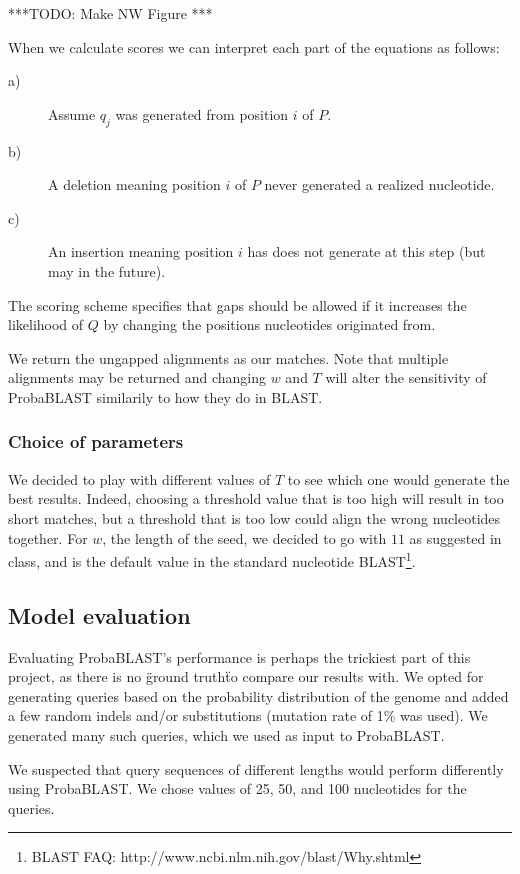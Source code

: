 \documentclass[12pt]{IEEEtran}
\begin{document}
***TODO: Make NW Figure ***

When we calculate scores we can interpret each part of the equations as follows:

\begin{description}
  \item[a)] Assume $q_j$ was generated from position $i$ of $P$.
  \item[b)] A deletion meaning position $i$ of $P$ never generated a realized nucleotide.
  \item[c)] An insertion meaning position $i$ has does not generate at this step (but may in the future).
\end{description}

The scoring scheme specifies that gaps should be allowed if it increases the likelihood of $Q$ by changing the positions nucleotides originated from.


We return the ungapped alignments as our matches. Note that multiple alignments may be returned and changing $w$ and $T$ will alter the sensitivity of ProbaBLAST similarily to how they do in BLAST.


\subsubsection{Choice of parameters}

We decided to play with different values of $T$ to see which one would generate the best results. Indeed, choosing a threshold value that is too high will result in too short matches, but a threshold that is too low could align the wrong nucleotides together.
For $w$, the length of the seed, we decided to go with $11$ as suggested in class, and is the default value in the standard nucleotide BLAST\footnote{BLAST FAQ: http://www.ncbi.nlm.nih.gov/blast/Why.shtml}.

\subsection{Model evaluation}

Evaluating ProbaBLAST's performance is perhaps the trickiest part of this project, as there is no \"ground truth\" to compare our results with. We opted for generating queries based on the probability distribution of the genome and added a few random indels and/or substitutions (mutation rate of 1\% was used). We generated many such queries, which we used as input to ProbaBLAST.

We suspected that query sequences of different lengths would perform differently using ProbaBLAST. We chose values of 25, 50, and 100 nucleotides for the queries. 
\end{document}
